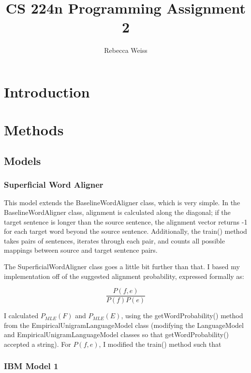 \documentclass[]{article}
\title{CS 224n Programming Assignment 2}
\author{Rebecca Weiss}
\date{}
\newif\ifpdf
\begin{document}
\onehalfspacing

\ifpdf
\DeclareGraphicsExtensions{.pdf, .jpg, .tif}
\else
{}
\fi

\maketitle

\section{Introduction}

\section{Methods}

\subsection{Models}

\subsubsection{Superficial Word Aligner}

This model extends the BaselineWordAligner class, which is very simple.  In the BaselineWordAligner class, alignment is calculated along the diagonal; if the target sentence is longer than the source sentence, the alignment vector returns -1 for each target word beyond the source sentence.  Additionally, the train() method takes pairs of sentences, iterates through each pair, and counts all possible mappings between source and target sentence pairs.

The SuperficialWordAligner class goes a little bit further than that.  I based my implementation off of the suggested alignment probability, expressed formally as:

\begin{equation}
\frac{P(f,e)}{P(f)P(e)}
\end{equation}

I calculated $P_{MLE}(F)$ and $P_{MLE}(E)$, using the getWordProbability() method from the EmpiricalUnigramLanguageModel class (modifying the LanguageModel and EmpiricalUnigramLanguageModel classes so that getWordProbability() accepted a string).  For $P(f,e)$, I modified the train() method such that 


\subsubsection{IBM Model 1}
\end{document}
